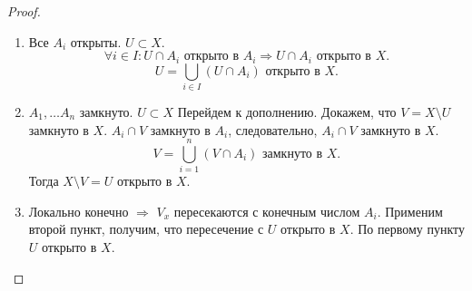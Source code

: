 \documentclass[11pt]{book}
\theoremstyle{definition}
\theoremstyle{plain}
\theoremstyle{plain}
\theoremstyle{definition}
\theoremstyle{remark}
\begin{document}
\begin{proof}
    $ $
    \begin{enumerate}
        \item Все  $ A_i$ открыты. $ U \subset X$.
	    \[
	    \forall  i \in I: U \cap A_i \text{ открыто в } A_i \Longrightarrow U \cap A_i \text{ открыто в } X
	    .\] 
	    \[
		U = \bigcup_{i \in  I} (U \cap A_i) \text{ открыто в }X
	    .\] 
	\item $ A_1, \ldots A_n$ замкнуто. $ U \subset X$
Перейдем к дополнению. Докажем, что $ V = X \setminus U$ замкнуто в $ X$.  $ A_i \cap V $ замкнуто в $ A_i$, следовательно, $ A_i \cap V$ замкнуто в $ X$. 
\[
    V = \bigcup_{i=1} ^{n}(V \cap A_i) \text{ замкнуто в } X
.\] 
Тогда $ X \setminus V = U $ открыто в $ X$.
\item Локально конечно  $ \Longrightarrow $ $ V_x$ пересекаются с конечным числом  $ A_i$. Применим второй пункт, получим, что пересечение с  $ U$ открыто в  $ X$.
    По первому пункту  $ U$ открыто в  $ X$.
    \end{enumerate}
\end{proof}
\end{document}
